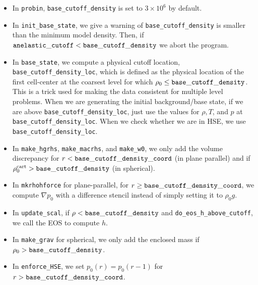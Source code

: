 \begin{itemize}

\item In {\tt probin}, {\tt base\_cutoff\_density} is set to $3\times 10^6$ by default.

\item In {\tt init\_base\_state}, we give a warning of {\tt base\_cutoff\_density}
  is smaller than the minimum model density.  Then, if ${\tt anelastic\_cutoff} 
  < {\tt base\_cutoff\_density}$ we abort the program.

\item In {\tt base\_state}, we compute a physical cutoff location,
  {\tt base\_cutoff\_density\_loc}, which is defined as the physical
  location of the first cell-center at the coarsest level for which
  $\rho_0 \le {\tt base\_cutoff\_density}$.  This is a trick used for making
  the data consistent for multiple level problems.  When we are generating the 
  initial background/base state, if we are above {\tt base\_cutoff\_density\_loc}, 
  just use the values for $\rho,T$, and $p$ at {\tt base\_cutoff\_density\_loc}.
  When we check whether we are in HSE, we use {\tt base\_cutoff\_density\_loc}.

\item In {\tt make\_hgrhs}, {\tt make\_macrhs}, and {\tt make\_w0}, 
  we only add the volume discrepancy for $r < {\tt base\_cutoff\_density\_coord}$
  (in plane parallel) and if $\rho_0^{\rm cart} > {\tt base\_cutoff\_density}$ 
  (in spherical).

\item In {\tt mkrhohforce} for plane-parallel, for
  $r \ge {\tt base\_cutoff\_density\_coord}$, we
  compute $\nabla p_0$ with a difference stencil instead of simply
  setting it to $\rho_0 g$.

\item In {\tt update\_scal}, if $\rho < {\tt base\_cutoff\_density}$
   and {\tt do\_eos\_h\_above\_cutoff}, we call the EOS to compute $h$.

\item In {\tt make\_grav} for spherical, we only add the enclosed mass if
  $\rho_0 > {\tt base\_cutoff\_density}$.

\item In {\tt enforce\_HSE}, we set $p_0(r) = p_0(r-1)$ for 
  $r > {\tt base\_cutoff\_density\_coord}$.

\end{itemize}

